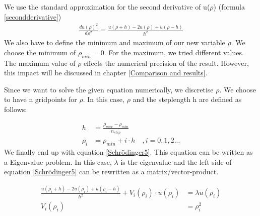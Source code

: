 \documentclass[10pt,a4paper]{article}
\begin{document}
We use the standard approximation for the second derivative of u($\rho$) (formula \ref{secondderivative})
\begin{align}
\frac{du(\rho)^2}{d \rho^2}= \frac{u(\rho+h)-2u(\rho)+u(\rho-h)}{h^2} \label{secondderivative}
\end{align}
We also have to define the minimum and maximum of our new variable $\rho$. We choose the minimum of $\rho_{min}=0$. For the maximum, we tried different values. The maximum value of $\rho$ effects the numerical precision of the result. However, this impact will be discussed in chapter \ref{Comparison and results}.

Since we want to solve the given equation numerically, we discretise $\rho$. We choose to have n gridpoints for $\rho$. In this case, $\rho$ and the steplength h are defined as follows:

\begin{align}
h &=\frac{\rho_{max}-\rho_{min}}{n_{step}}\\
\rho_i &= \rho_{min}+i \cdot h \quad, i=0,1,2...
\end{align}
We finally end up with equation \ref{Schrödinger5}. This equation can be written as a Eigenvalue problem. In this case, $\lambda$ is the eigenvalue and the left side of equation \ref{Schrödinger5} can be rewritten as a matrix/vector-product.

\begin{align}
\frac{u(\rho_i+h)-2u(\rho_i)+u(\rho_i-h)}{h^2}  + V_i(\rho_i) \cdot u(\rho_i) &= \lambda u(\rho_i) \label{Schrödinger5}\\
V_i(\rho_i) &= \rho_i^2
\end{align}
\end{document}
